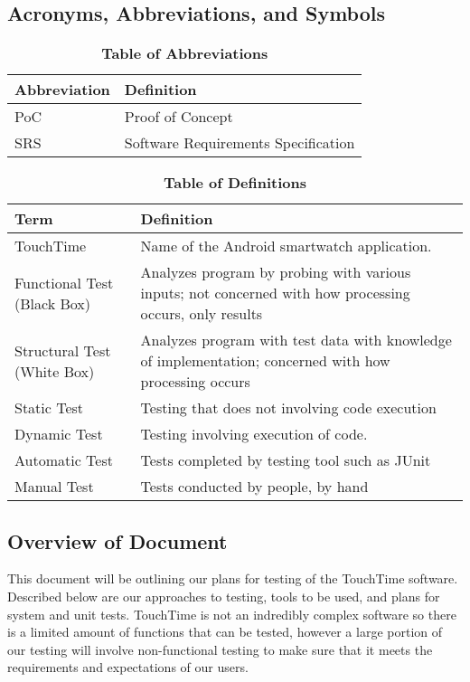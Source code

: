 \subsection{Acronyms, Abbreviations, and Symbols}
	
\begin{table}[H]
\caption{\textbf{Table of Abbreviations}} \label{Table}

\begin{tabularx}{\textwidth}{p{3cm}X}
\toprule
\textbf{Abbreviation} & \textbf{Definition} \\
\midrule
PoC & Proof of Concept\\
SRS & Software Requirements Specification\\
\bottomrule
\end{tabularx}

\end{table}

\begin{table}[H]
\caption{\textbf{Table of Definitions}} \label{Table}

\begin{tabularx}{\textwidth}{p{3cm}X}
\toprule
\textbf{Term} & \textbf{Definition}\\
\midrule
TouchTime & Name of the Android smartwatch application. \\ \hline
Functional Test (Black Box) & Analyzes program by probing with various inputs; not concerned with how processing occurs, only results \\ \hline
Structural Test (White Box) & Analyzes program with test data with knowledge of implementation; concerned with how processing occurs \\ \hline
Static Test & Testing that does not involving code execution\\ \hline
Dynamic Test & Testing involving execution of code.\\ \hline
Automatic Test & Tests completed by testing tool such as JUnit\\ \hline
Manual Test & Tests conducted by people, by hand \\
\bottomrule
\end{tabularx}

\end{table}	

\subsection{Overview of Document}
This document will be outlining our plans for testing of the TouchTime software. Described below are our approaches to testing, tools to be used, and plans for system and unit tests. TouchTime is not an indredibly complex software so there is a limited amount of functions that can be tested, however a large portion of our testing will involve non-functional testing to make sure that it meets the requirements and expectations of our users.

